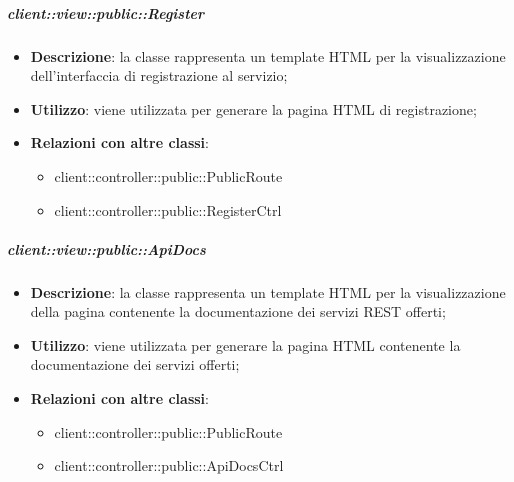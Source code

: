 		\subparagraph{client::view::public::Register} %
		\label{subp:bdsm_app_client_view_public_register}
			\begin{itemize}
				\item \textbf{Descrizione}: la classe rappresenta un template HTML per la visualizzazione dell'interfaccia di registrazione al servizio;
				\item \textbf{Utilizzo}: viene utilizzata per generare la pagina HTML di registrazione;
				\item \textbf{Relazioni con altre classi}:
					\begin{itemize}
						\item client::controller::public::PublicRoute
						\item client::controller::public::RegisterCtrl
					\end{itemize}
			\end{itemize}

		\subparagraph{client::view::public::ApiDocs} %
		\label{subp:bdsm_app_client_view_public_apidocs}
			\begin{itemize}
				\item \textbf{Descrizione}: la classe rappresenta un template HTML per la visualizzazione della pagina contenente la documentazione dei servizi REST offerti;
				\item \textbf{Utilizzo}: viene utilizzata per generare la pagina HTML contenente la documentazione dei servizi offerti;
				\item \textbf{Relazioni con altre classi}:
					\begin{itemize}
						\item client::controller::public::PublicRoute
						\item client::controller::public::ApiDocsCtrl
					\end{itemize}
			\end{itemize}



